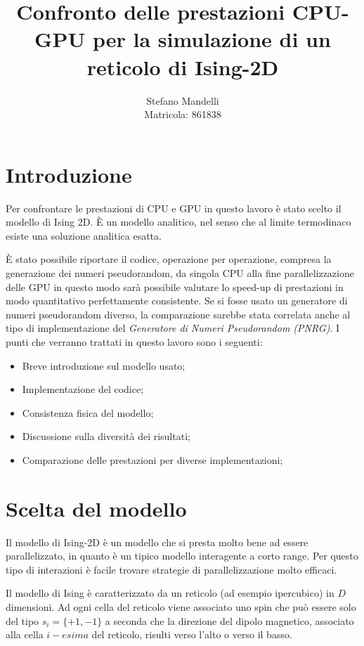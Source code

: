 \documentclass[a4paper,12pt]{article}
\begin{document}
\author{Stefano Mandelli\\
Matricola: 861838}
\title{\bf \Huge Confronto delle prestazioni CPU-GPU per la simulazione di un reticolo di Ising-2D}
\date{}
\maketitle
\section*{Introduzione}
Per confrontare le prestazioni di CPU e GPU in questo lavoro è stato scelto il modello di Ising 2D. \`E un modello analitico, nel senso che al limite termodinaco esiste una soluzione analitica esatta. 

\`E stato possibile riportare il codice, operazione per operazione, compresa la generazione dei numeri pseudorandom, da singola CPU alla fine parallelizzazione delle GPU in questo modo sarà possibile valutare lo speed-up di prestazioni in modo quantitativo perfettamente consistente. Se si fosse usato un generatore di numeri pseudorandom diverso, la comparazione sarebbe stata correlata anche al tipo di implementazione del \emph{Generatore di Numeri Pseudorandom (PNRG)}. I punti che verranno trattati in questo lavoro sono i seguenti:
\begin{itemize}
	\item Breve introduzione sul modello usato;
	\item Implementazione del codice;
	\item Consistenza fisica del modello;
	\item Discussione sulla diversità dei risultati;
	\item Comparazione delle prestazioni per diverse implementazioni;
\end{itemize}

\section{Scelta del modello}
Il modello di Ising-2D è un modello che si presta molto bene ad essere parallelizzato, in quanto è un tipico modello interagente a corto range. Per questo tipo di interazioni \`e facile trovare strategie di parallelizzazione molto efficaci.

Il modello di Ising è caratterizzato da un reticolo (ad esempio ipercubico) in $D$ dimensioni. Ad ogni cella del reticolo viene associato uno spin che può essere solo del tipo $s_i=\lbrace +1, -1 \rbrace$ a seconda che la direzione del dipolo magnetico, associato alla cella $i-esima$ del reticolo, risulti verso l'alto o verso il basso. 
\end{document}
